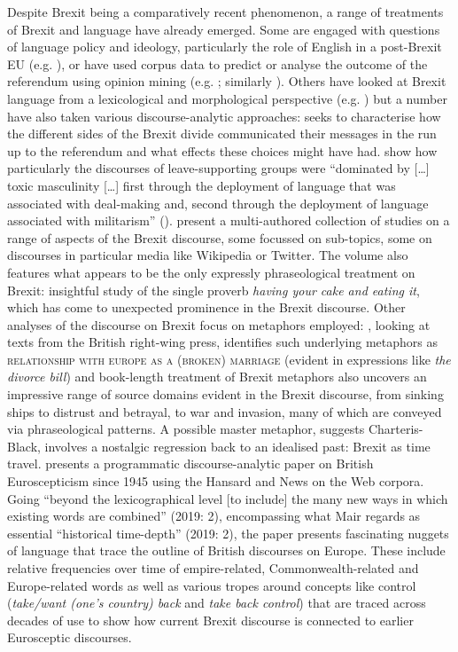\documentclass[output=paper]{langscibook}
\begin{document}
Despite Brexit being a comparatively recent phenomenon, a range of treatments of Brexit and language have already emerged. Some are engaged with questions of language policy and ideology, particularly the role of English in a post-Brexit EU (e.g. \citealt{Jacobsen2017,Kelly2018,Modiano2017}), or have used corpus data to predict or analyse the outcome of the referendum using opinion mining (e.g. \citealt{CelliEtAl2016}; similarly \citealt{SimakiEtAl2017}). Others have looked at Brexit language from a lexicological and morphological perspective (e.g. \citealt{Fontaine2017,Lalić-KrstinSilaški2018}) but a number have also taken various discourse-analytic approaches: \citet{Buckledee2018} seeks to characterise how the different sides of the Brexit divide communicated their messages in the run up to the referendum and what effects these choices might have had. \citet{Achilleos-SarllMartill2019} show how particularly the discourses of leave-supporting groups were “dominated by […] toxic masculinity […] first through the deployment of language that was associated with deal-making and, second through the deployment of language associated with militarism” (\citeyear[15]{Achilleos-SarllMartill2019}). \citet{KollerEtAl2019} present a multi-authored collection of studies on a range of aspects of the Brexit discourse, some focussed on sub-topics, some on discourses in particular media like Wikipedia or Twitter. The volume also features what appears to be the only expressly phraseological treatment on Brexit:  insightful study of the single proverb \textit{having your cake and eating it}, which has come to unexpected prominence in the Brexit discourse. Other analyses of the discourse on Brexit focus on metaphors employed: \citet{Islentyeva2019}, looking at texts from the British right-wing press, identifies such underlying metaphors as \textsc{relationship with europe as a (broken) marriage} (evident in expressions like \textit{the divorce bill}) and  book-length treatment of Brexit metaphors also uncovers an impressive range of source domains evident in the Brexit discourse, from sinking ships to distrust and betrayal, to war and invasion, many of which are conveyed via phraseological patterns. A possible master metaphor, suggests Charteris-Black, involves a nostalgic regression back to an idealised past: Brexit as time travel. \citet{Mair2019} presents a programmatic discourse-analytic paper on British Euroscepticism since 1945 using the Hansard and News on the Web corpora. Going ``beyond the lexicographical level [to include] the many new ways in which existing words are combined'' (2019: 2), encompassing what Mair regards as essential ``historical time-depth'' (2019: 2), the paper presents fascinating nuggets of language that trace the outline of British discourses on Europe. These include relative frequencies over time of empire-related, Commonwealth-related and Europe-related words as well as various tropes around concepts like control (\textit{take/want (one’s country) back} and \textit{take back control}) that are traced across decades of use to show how current Brexit discourse is connected to earlier Eurosceptic discourses.
\end{document}

